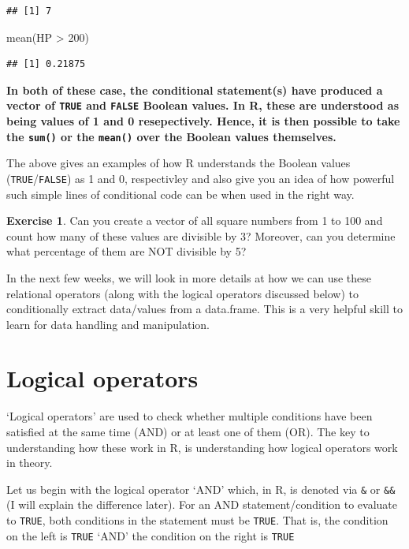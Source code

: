 \documentclass[
]{book}
\newenvironment{Shaded}{\begin{snugshade}}{\end{snugshade}}
\newcommand{\DecValTok}[1]{\textcolor[rgb]{0.00,0.00,0.81}{#1}}
\newcommand{\FunctionTok}[1]{\textcolor[rgb]{0.00,0.00,0.00}{#1}}
\newcommand{\NormalTok}[1]{#1}
\newcommand{\SpecialCharTok}[1]{\textcolor[rgb]{0.00,0.00,0.00}{#1}}
\theoremstyle{definition}
\theoremstyle{definition}
\theoremstyle{definition}
\newtheorem{exercise}{Exercise}[chapter]
\theoremstyle{definition}
\theoremstyle{remark}
\begin{document}
\begin{verbatim}
## [1] 7
\end{verbatim}

\begin{Shaded}
\begin{Highlighting}[]
\FunctionTok{mean}\NormalTok{(HP }\SpecialCharTok{\textgreater{}} \DecValTok{200}\NormalTok{) }
\end{Highlighting}
\end{Shaded}

\begin{verbatim}
## [1] 0.21875
\end{verbatim}

\textbf{In both of these case, the conditional statement(s) have produced a vector of \texttt{TRUE} and \texttt{FALSE} Boolean values. In R, these are understood as being values of 1 and 0 resepectively. Hence, it is then possible to take the \texttt{sum()} or the \texttt{mean()} over the Boolean values themselves.}

The above gives an examples of how R understands the Boolean values (\texttt{TRUE}/\texttt{FALSE}) as 1 and 0, respectivley and also give you an idea of how powerful such simple lines of conditional code can be when used in the right way.

\begin{exercise}
Can you create a vector of all square numbers from 1 to 100 and count how many of these values are divisible by 3? Moreover, can you determine what percentage of them are NOT divisible by 5?
\end{exercise}

In the next few weeks, we will look in more details at how we can use these relational operators (along with the logical operators discussed below) to conditionally extract data/values from a data.frame. This is a very helpful skill to learn for data handling and manipulation.

\hypertarget{logical-operators}{%
\section{Logical operators}\label{logical-operators}}

`Logical operators' are used to check whether multiple conditions have been satisfied at the same time (AND) or at least one of them (OR). The key to understanding how these work in R, is understanding how logical operators work in theory.

Let us begin with the logical operator `AND' which, in R, is denoted via \texttt{\&} or \texttt{\&\&} (I will explain the difference later). For an AND statement/condition to evaluate to \texttt{TRUE}, both conditions in the statement must be \texttt{TRUE}. That is, the condition on the left is \texttt{TRUE} `AND' the condition on the right is \texttt{TRUE}
\end{document}
